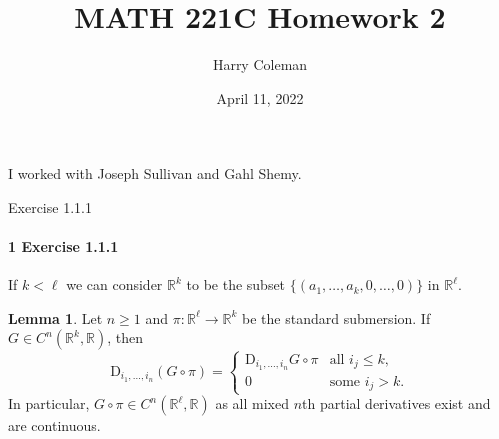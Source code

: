 \documentclass[12pt]{article}
\renewcommand{\maketitle}{\thispagestyle{title}}
\newlength{\myparskip}
\newenvironment{fullbox}{\begin{lrbox}{\savefullbox}\begin{minipage}{\dimexpr\textwidth-2\fboxsep\relax}\setlength{\parskip}{\myparskip}}{\end{minipage}\end{lrbox}\framebox[\textwidth]{\usebox{\savefullbox}}}
\newenvironment{pbox}[1][]{\begin{fullbox}\ifx#1\empty\else\paragraph{#1}\phantom{}\fi}{\end{fullbox}}
\theoremstyle{definition}
\newtheorem{lemma}{Lemma}
\newcommand{\R}{\mathbb{R}}
\newcommand{\<}{\langle}
\renewcommand{\>}{\rangle}
\newcommand{\DD}{\mathrm{D}}
\begin{document}
\title{MATH 221C Homework 2}
\author{Harry Coleman}
\date{April 11, 2022}
\maketitle

I worked with Joseph Sullivan and Gahl Shemy.

\begin{pbox}[1 Exercise 1.1.1]
    If $k < \ell$ we can consider $\R^k$ to be the subset $\{(a_1, \dots, a_k, 0, \dots, 0)\}$ in $\R^\ell$.
    
\end{pbox}

\begin{lemma}
    Let $n \geq 1$ and $\pi : \R^\ell \to \R^k$ be the standard submersion.
    If $G \in C^n(\R^k, \R)$, then
    \[
        \DD_{i_1, \dots, i_n} (G \circ \pi) = \begin{cases}
            \DD_{i_1, \dots, i_n} G \circ \pi & \text{all } i_j \leq k, \\
            0 & \text{some } i_j > k.
        \end{cases}
    \]
    In particular, $G \circ \pi \in C^n(\R^\ell, \R)$ as all mixed $n$th partial derivatives exist and are continuous.
\end{lemma}
\end{document}
